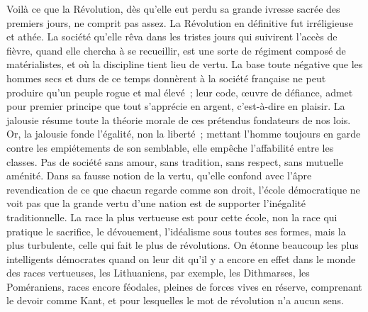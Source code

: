 \documentclass[french,twoside]{book} %
\begin{document}
Voilà ce que la Révolution, dès qu’elle eut perdu sa grande ivresse sacrée des premiers jours, ne comprit pas assez. La Révolution en définitive fut irréligieuse et athée. La société qu’elle rêva dans les tristes jours qui suivirent l’accès de fièvre, quand elle chercha à se recueillir, est une sorte de régiment composé de matérialistes, et où la discipline tient lieu de vertu. La base toute négative que les hommes secs et durs de ce temps donnèrent à la société française ne peut produire qu’un peuple rogue et mal élevé ; leur code, œuvre de défiance, admet pour premier principe que tout s’apprécie en argent, c’est-à-dire en plaisir. La jalousie résume toute la théorie morale de ces prétendus fondateurs de nos lois. Or, la jalousie fonde l’égalité, non la liberté ; mettant l’homme toujours en garde contre les empiétements de son semblable, elle empêche l’affabilité entre les classes. Pas de société sans amour, sans tradition, sans respect, sans mutuelle aménité. Dans sa fausse notion de la vertu, qu’elle confond avec l’âpre revendication de ce que chacun regarde comme son droit, l’école démocratique ne voit pas que la grande vertu d’une nation est de supporter l’inégalité traditionnelle. La race la plus vertueuse est pour cette école, non la race qui pratique le sacrifice, le dévouement, l’idéalisme sous toutes ses formes, mais la plus turbulente, celle qui fait le plus de révolutions. On étonne beaucoup les plus intelligents démocrates quand on leur dit qu’il y a encore en effet dans le monde des races vertueuses, les Lithuaniens, par exemple, les Dithmarses, les Poméraniens, races encore féodales, pleines de forces vives en réserve, comprenant le devoir comme Kant, et pour lesquelles le mot de révolution n’a aucun sens.\par
\end{document}
